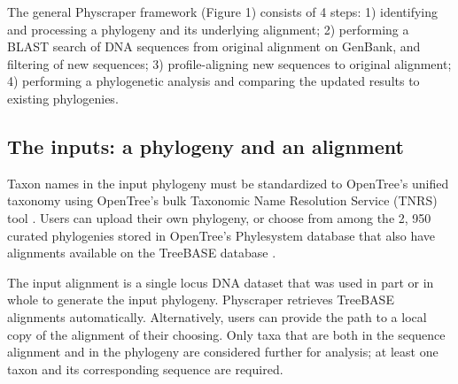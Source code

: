 \documentclass{bmcart}
\begin{document}

The general Physcraper framework (Figure 1) consists of 4 steps: 1) identifying and
processing a phylogeny and its underlying alignment; 2) performing a BLAST search of
DNA sequences from original alignment on GenBank, and filtering of new sequences;
3) profile-aligning new sequences to original alignment; 4) performing a phylogenetic
analysis and comparing the updated results to existing phylogenies.


\subsection*{The inputs: a phylogeny and an alignment}

Taxon names in the input phylogeny must be standardized to OpenTree's unified taxonomy
\cite{ott3.2} using OpenTree's bulk Taxonomic Name Resolution Service
(TNRS) tool \cite{TNRStool}. Users can upload their
own phylogeny, or choose from among the 2, 950 curated phylogenies stored in OpenTree's
Phylesystem database \cite{phylesystemGithub} that also have
alignments available on the TreeBASE database \cite{treebase_website, supertreebase}.

The input alignment is a single locus DNA dataset that was used in part or in
whole to generate the input phylogeny. Physcraper retrieves TreeBASE alignments
automatically. Alternatively, users can provide the path to a local copy of the
alignment of their choosing.
Only taxa that are both in the sequence alignment and in the phylogeny are considered
further for analysis; at least one taxon and its corresponding sequence are required.
\end{document}
